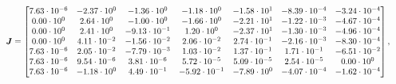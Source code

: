 \begin{equation}
    \resizebox{\textwidth}{!}{$\displaystyle
\boldsymbol{J} =\begin{bmatrix}
    7.63 \cdot 10^{-6} & -2.37 \cdot 10^{0} & -1.36 \cdot 10^{0} & -1.18 \cdot 10^{0} & -1.58 \cdot 10^{1} & -8.39 \cdot 10^{-4} & -3.24 \cdot 10^{-4} \\
    0.00 \cdot 10^{0} & 2.64 \cdot 10^{0} & -1.00 \cdot 10^{0} & -1.66 \cdot 10^{0} & -2.21 \cdot 10^{1} & -1.22 \cdot 10^{-3} & -4.67 \cdot 10^{-4} \\
    0.00 \cdot 10^{0} & 2.41 \cdot 10^{0} & -9.13 \cdot 10^{-1} & 1.20 \cdot 10^{0} & -2.37 \cdot 10^{1} & -1.30 \cdot 10^{-3} & -4.96 \cdot 10^{-4} \\
    0.00 \cdot 10^{0} & 4.11 \cdot 10^{-2} & -1.56 \cdot 10^{-2} & 2.06 \cdot 10^{-2} & 2.74 \cdot 10^{-1} & -2.16 \cdot 10^{-3} & -8.30 \cdot 10^{-4} \\
    7.63 \cdot 10^{-6} & 2.05 \cdot 10^{-2} & -7.79 \cdot 10^{-3} & 1.03 \cdot 10^{-2} & 1.37 \cdot 10^{-1} & 1.71 \cdot 10^{-1} & -6.51 \cdot 10^{-2} \\
    7.63 \cdot 10^{-6} & 9.54 \cdot 10^{-6} & 3.81 \cdot 10^{-6} & 5.72 \cdot 10^{-5} & 5.09 \cdot 10^{-5} & 2.54 \cdot 10^{-5} & 0.00 \cdot 10^{0} \\
    7.63 \cdot 10^{-6} & -1.18 \cdot 10^{0} & 4.49 \cdot 10^{-1} & -5.92 \cdot 10^{-1} & -7.89 \cdot 10^{0} & -4.07 \cdot 10^{-4} & -1.62 \cdot 10^{-4}
  \end{bmatrix},
    $}
\label{eq:jacobianFPGA}
\end{equation}

